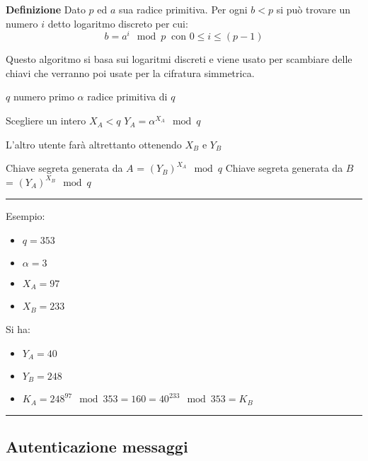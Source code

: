\documentclass{article}
\begin{document}
\noindent\textbf{Definizione} Dato $p$ ed $a$ sua radice primitiva. Per ogni $b<p$ si può trovare un numero $i$ detto logaritmo discreto per cui:
$$b=a^i\mod p\ \text{ con }0\leq i\leq(p-1)$$\newline

\noindent Questo algoritmo si basa sui logaritmi discreti e viene usato per scambiare delle chiavi che verranno poi usate per la cifratura simmetrica.

\begin{algorithm}[ht]
\begin{algorithmic}

\State $q$ numero primo 
\State $\alpha$ radice primitiva di $q$

\State

\State Scegliere un intero $X_A<q$ 
\State $Y_A=\alpha^{X_A}\mod q$ 

\State L'altro utente farà altrettanto ottenendo $X_B$ e $Y_B$

\State

\State Chiave segreta generata da $A$ = $(Y_B)^{X_A}\mod q$
\State Chiave segreta generata da $B$ = $(Y_A)^{X_B}\mod q$

\end{algorithmic}
\end{algorithm}

\noindent\rule{\textwidth}{0.5pt}

Esempio:
\begin{itemize}
    \item $q=353$
    \item $\alpha=3$
    \item $X_A=97$
    \item $X_B=233$\newline
\end{itemize}

\noindent Si ha:
\begin{itemize}
    \item $Y_A=40$
    \item $Y_B=248$
    \item $K_A=248^{97}\mod 353=160=40^{233}\mod 353=K_B$
\end{itemize}

\noindent\rule{\textwidth}{0.5pt}

\subsection{Autenticazione messaggi}
\end{document}
